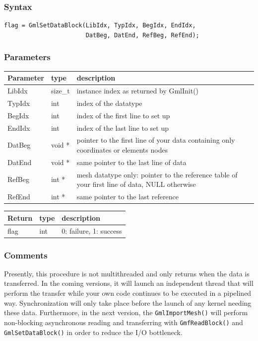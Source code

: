 \documentclass[a4paper,12pt]{article}
\begin{document}
\subsubsection*{Syntax}
\begin{tt}
\begin{verbatim}
flag = GmlSetDataBlock(LibIdx, TypIdx, BegIdx, EndIdx, 
                       DatBeg, DatEnd, RefBeg, RefEnd);
\end{verbatim}
\end{tt}
\normalfont

\subsubsection*{Parameters}
\begin{tabular}{|m{2cm}|m{1.5cm}|m{10.5cm}|}
\hline
Parameter  & type    & description \\
\hline
LibIdx     & size\_t & instance index as returned by GmlInit() \\
\hline
TypIdx     & int     & index of the datatype \\
\hline
BegIdx     & int     & index of the first line to set up \\
\hline
EndIdx     & int     & index of the last line to set up \\
\hline
DatBeg     & void *  & pointer to the first line of your data containing only coordinates or elements nodes \\
\hline
DatEnd     & void *  & same pointer to the last line of data \\
\hline
RefBeg     & int *   & mesh datatype only: pointer to the reference table of your first line of data, NULL otherwise \\
\hline
RefEnd     & int *   & same pointer to the last reference \\
\hline
\end{tabular}

\medskip

\begin{tabular}{|m{2cm}|m{1.5cm}|m{10.5cm}|}
\hline
Return     & type   & description \\
\hline
flag       & int    & 0: failure, 1: success \\
\hline
\end{tabular}

\subsubsection*{Comments}
Presently, this procedure is not multithreaded and only returns when the data is transferred. In the coming versions, it will launch an independent thread that will perform the transfer while your own code continues to be executed in a pipelined way. Synchronization will only take place before the launch of any kernel needing these data. Furthermore, in the next version, the {\tt GmlImportMesh()} will perform non-blocking asynchronous reading and transferring with {\tt GmfReadBlock()} and {\tt GmlSetDataBlock()} in order to reduce the I/O bottleneck.
\end{document}
